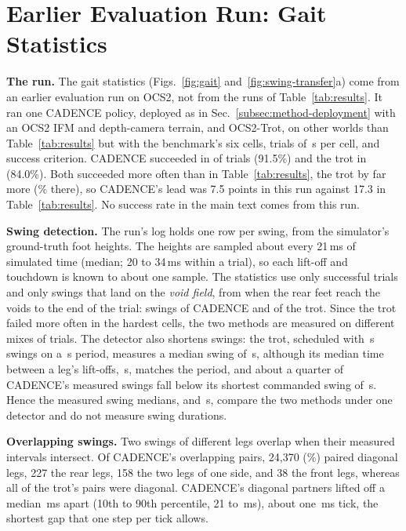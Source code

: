 \section{Earlier Evaluation Run: Gait Statistics}
\label{app:earlier-run}

\noindent\textbf{The run.}
 The gait statistics (Figs.~\ref{fig:gait}
and~\ref{fig:swing-transfer}a) come from an earlier evaluation run on
OCS2, not from the runs of Table~\ref{tab:results}. It ran one CADENCE
policy, deployed as in Sec.~\ref{subsec:method-deployment} with an OCS2
IFM and depth-camera terrain, and OCS2-Trot, on other worlds than
Table~\ref{tab:results} but with the benchmark's six cells,
\corlBenchTrialsPerCell{} trials of \corlBenchTrialSeconds\,s per cell,
and success criterion. CADENCE succeeded in \corlGaitTrialsGaitNet{} of
\corlBenchTrialsPerArm{} trials (91.5\%) and the trot in
\corlGaitTrialsTrot{} (84.0\%). Both succeeded more often than in
Table~\ref{tab:results}, the trot by far more (\corlBenchTrot\% there),
so CADENCE's lead was 7.5 points in this run against 17.3 in
Table~\ref{tab:results}. No success rate in the main text comes from
this run.

\noindent\textbf{Swing detection.}
 The run's log holds one row per swing, from the
simulator's ground-truth foot heights. The heights are sampled about
every 21\,ms of simulated time (median; 20 to 34\,ms within a trial),
so each lift-off and touchdown is known to about one sample. The
statistics use only successful trials and only swings that land on the
\emph{void field}, from when the rear feet reach the voids to the end
of the trial: \corlGaitSwingsGaitNet{} swings of
CADENCE and \corlGaitSwingsTrot{} of the trot. Since the trot failed
more often in the hardest cells, the two methods are measured on
different mixes of trials. The detector also shortens swings: the trot,
scheduled with \corlTrotSwing\,s swings on a \corlTrotPeriod\,s period,
measures a median swing of \corlGaitTrotSwingMeasured\,s, although its
median time between a leg's lift-offs, \corlGaitTrotPeriodMeasured\,s,
matches the period, and about a quarter of CADENCE's measured swings
fall below its shortest commanded swing of
\corlSwingDurationMin\,s. Hence the measured swing medians,
\corlGaitSwingMedian{} and \corlGaitSwingMedianTrot\,s, compare the two
methods under one detector and do not measure swing durations.

\noindent\textbf{Overlapping swings.}
 Two swings of different legs overlap when their measured
intervals intersect. Of CADENCE's \corlGaitOverlapPairs{} overlapping
pairs, 24{,}370 (\corlGaitDiagPairPct\%) paired diagonal legs, 227 the
rear legs, 158 the two legs of one side, and 38 the front legs, whereas
all of the trot's pairs were diagonal. CADENCE's diagonal partners
lifted off a median \corlGaitLiftLagMs\,ms apart (10th to 90th
percentile, 21 to \corlGaitEventWindowMs\,ms), about one
\corlControlTickMs\,ms tick, the shortest gap that one step per tick
allows.

